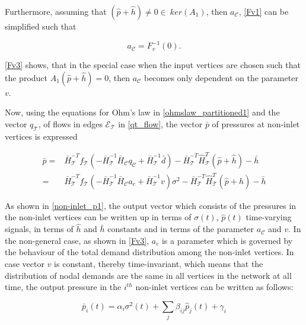 Furthermore, assuming that $(\hat{p} + \hat{h}) \neq 0 \in \: ker(A_1)$, then $a_{\mathcal{C}}$, \eqref{Fv1} can be simplified such that 

\begin{equation}
\label{Fv3}
a_{\mathcal{C}} = F_v^{-1} (0).
\end{equation}

\eqref{Fv3} shows, that in the special case when the input vertices are chosen such that the product $A_1 (\hat{p} + \hat{h}) = 0$, then $a_{\mathcal{C}}$ becomes only dependent on the parameter $v$. 

Now, using the equations for Ohm's law in \eqref{ohmslaw_partitioned1} and the vector $q_{\mathcal{T}}$, of flows in edges $\mathcal{E}_{\mathcal{T}}$ in \eqref{qt_flow}, the vector $\bar{p}$ of pressures at non-inlet vertices is expressed

\begin{equation}
\begin{split}
  \label{non-inlet_p1}
  \bar{p} = & \bar{H}^{-T}_{\mathcal{T}}f_{\mathcal{T}}(-\bar{H}^{-1}_{\mathcal{T}} \bar{H}_{\mathcal{C}} q_\mathcal{C} + \bar{H}^{-1}_{\mathcal{T}} \bar{d}) - \bar{H}^{-T}_{\mathcal{T}}\hat{H}^{T}_{\mathcal{T}} (\hat{p} + \hat{h}) - \bar{h} \\
  =&\bar{H}^{-T}_{\mathcal{T}}f_{\mathcal{T}}(-\bar{H}^{-1}_{\mathcal{T}} \bar{H}_{\mathcal{C}} a_c + \bar{H}^{-1}_{\mathcal{T}} v)\sigma^2 - \bar{H}^{-T}_{\mathcal{T}}\hat{H}^{T}_{\mathcal{T}} (\hat{p} + \hat{h}) - \bar{h}
\end{split}
\end{equation}

As shown in \eqref{non-inlet_p1}, the output vector which consists of the pressures in the non-inlet vertices can be written up in terms of $\sigma(t)$, $\hat{p}(t)$ time-varying signals, in terms of $\hat{h}$ and $\bar{h}$ constants and in terms of the parameter $a_{\mathcal{C}}$ and $v$. In the non-general case, as shown in \eqref{Fv3}, $a_c$ is a parameter which is governed by the behaviour of the total demand distribution among the non-inlet vertices. In case vector $v$ is constant, thereby time-invariant, which means that the distribution of nodal demands are the same in all vertices in the network at all time, the output pressure in the $i^{th}$ non-inlet vertices can be written as follows: 

\begin{equation}
\label{model_multiinlet1}
\bar{p}_i(t) = \alpha_i \sigma^2(t) + \sum_j \beta_{ij} \hat{p}_j(t) + \gamma_i
\end{equation}

